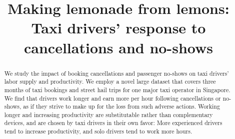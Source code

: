 \documentclass[reviewmode]{AEA}
\begin{document}
\title{Making lemonade from lemons: Taxi drivers' response to cancellations and no-shows}
\author{}

\begin{abstract}
	We study the impact of booking cancellations and passenger no-shows on taxi drivers' labor supply and productivity. We employ a novel large dataset that covers three months of taxi bookings and street hail trips for one major taxi operator in Singapore. We find that drivers work longer and earn more per hour following cancellations or no-shows, as if they strive to make up for the loss from such adverse actions. Working longer and increasing productivity are substitutable rather than complementary devices, and are chosen by taxi drivers in their own favor: More experienced drivers tend to increase productivity, and solo drivers tend to work more hours. 
\end{abstract}
\end{document}
